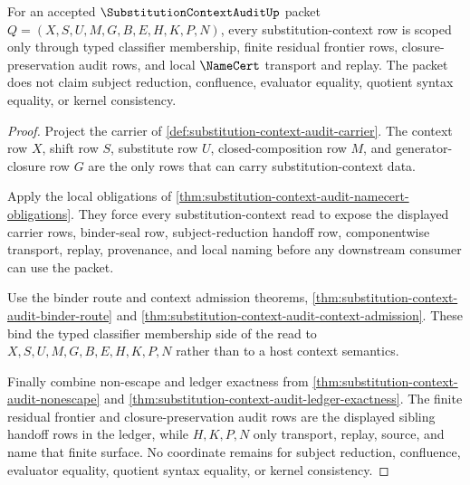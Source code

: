 \begin{theorem}
\label{thm:substitution-context-audit-metacic-scope}
For an accepted $\SubstitutionContextAuditUp$ packet $Q=(X,S,U,M,G,B,E,H,K,P,N)$, every substitution-context row is scoped only through typed classifier membership, finite residual frontier rows, closure-preservation audit rows, and local $\NameCert$ transport and replay. The packet does not claim subject reduction, confluence, evaluator equality, quotient syntax equality, or kernel consistency.
\end{theorem}
\begin{proof}
Project the carrier of \autoref{def:substitution-context-audit-carrier}. The context row $X$, shift row $S$, substitute row $U$, closed-composition row $M$, and generator-closure row $G$ are the only rows that can carry substitution-context data.

Apply the local obligations of \autoref{thm:substitution-context-audit-namecert-obligations}. They force every substitution-context read to expose the displayed carrier rows, binder-seal row, subject-reduction handoff row, componentwise transport, replay, provenance, and local naming before any downstream consumer can use the packet.

Use the binder route and context admission theorems, \autoref{thm:substitution-context-audit-binder-route} and \autoref{thm:substitution-context-audit-context-admission}. These bind the typed classifier membership side of the read to $X,S,U,M,G,B,E,H,K,P,N$ rather than to a host context semantics.

Finally combine non-escape and ledger exactness from \autoref{thm:substitution-context-audit-nonescape} and \autoref{thm:substitution-context-audit-ledger-exactness}. The finite residual frontier and closure-preservation audit rows are the displayed sibling handoff rows in the ledger, while $H,K,P,N$ only transport, replay, source, and name that finite surface. No coordinate remains for subject reduction, confluence, evaluator equality, quotient syntax equality, or kernel consistency.
\end{proof}


